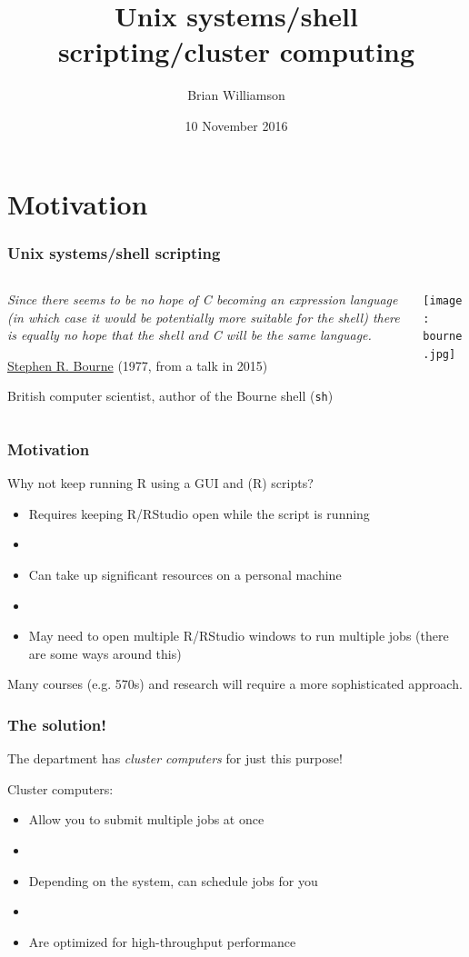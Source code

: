 \documentclass[12pt, 
hyperref={colorlinks=true, linkcolor=blue, urlcolor=cyan}]{beamer}
\title{Unix systems/shell scripting/cluster computing}
\author{Brian Williamson}
\institute{BIOST 561: Computational Skills For Biostatistics I}
\date{10 November 2016}
\newcommand{\myframe}[1]{\begin{frame} \frametitle{#1}}
\begin{document}
\begin{frame}
\titlepage
\end{frame}

\section{Motivation}
\myframe{Unix systems/shell scripting}
\begin{columns}[c]
\begin{column}{.66\textwidth}
\vspace{1cm}

\emph{Since there seems to be no hope of C becoming
an expression language (in which case it would be
potentially more suitable for the shell) there is
equally no hope that the shell and C will be the
same language.}

\vspace{2cm}
\href{https://en.wikipedia.org/wiki/Stephen_R._Bourne}{Stephen R. Bourne} (1977, from a talk in 2015)

British computer scientist, author of the Bourne shell (\texttt{sh})  
\end{column}
\begin{column}{.33\textwidth}
\texttt{[image: bourne.jpg]}
\end{column}
\end{columns}
\end{frame}

\myframe{Motivation}
Why not keep running R using a GUI and (R) scripts?
\begin{itemize}
\item Requires keeping R/RStudio open while the script is running
\item[]
\item Can take up significant resources on a personal machine
\item[]
\item May need to open multiple R/RStudio windows to run multiple jobs (there are some ways around this)
\end{itemize}

Many courses (e.g. 570s) and research will require a more sophisticated approach.
\end{frame}

\myframe{The solution!}
The department has \emph{cluster computers} for just this purpose!

Cluster computers:
\begin{itemize}
\item Allow you to submit multiple jobs at once
\item[]
\item Depending on the system, can schedule jobs for you
\item[]
\item Are optimized for high-throughput performance
\end{itemize}
\end{frame}
\end{document}
